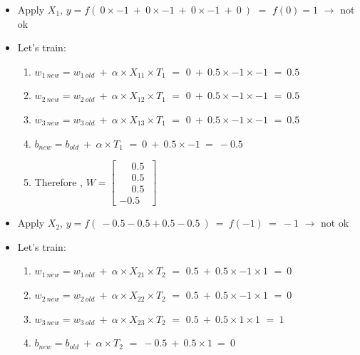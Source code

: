 \documentclass[12pt]{article}
\begin{document}
\begin{itemize}
	\item Apply $X_1$, $y = f( \  0 \times -1 \ + \  0 \times -1\ + \ 0 \times -1\ + \ 0\ )$ $ = $ $f(0) =  1$ $\rightarrow$ not ok
	
	\item Let's train:
			{
				\begin{enumerate}
					
					\item $w_{1\ new} = w_{1\ old}\ +\ \alpha \times X_{11} \times T_1$ $=$ $0\ +\ 0.5 \times -1 \times -1$ $=\ 0.5$
					\item $w_{2\ new} = w_{2\ old}\ +\ \alpha \times X_{12} \times T_1$ $=$ $0\ +\ 0.5 \times -1 \times -1$ $=\ 0.5$
					\item $w_{3\ new} = w_{3\ old}\ +\ \alpha \times X_{13} \times T_1$ $=$ $0\ +\ 0.5 \times -1 \times -1$ $=\ 0.5$
					\item $b_{new} = b_{old} \ + \ \alpha \times T_1$ $=\ 0 \ + \ 0.5 \times -1 \ = \ -0.5$
						
					\item Therefore , $ W = \begin{bmatrix}
						\phantom{-}0.5\ \\ 	
						\phantom{-}0.5\ \\ 	
						\phantom{-}0.5\ \\ 
						-0.5\ 
					\end{bmatrix}$
				\end{enumerate}
			}
		
		\item Apply $X_2$, $y = f(\ -0.5 - 0.5 + 0.5 - 0.5\ ) \ = \ f(-1) \ = \ -1 $ $\rightarrow$ not ok
		
		\item Let's train:
			{
				\begin{enumerate}
						
					\item $w_{1\ new} = w_{1\ old}\ +\ \alpha \times X_{21} \times T_2$ $=$ $0.5\ +\ 0.5 \times -1 \times 1$ $=\ 0$
					\item $w_{2\ new} = w_{2\ old}\ +\ \alpha \times X_{22} \times T_2$ $=$ $0.5\ +\ 0.5 \times -1 \times 1$ $=\ 0$
					\item $w_{3\ new} = w_{3\ old}\ +\ \alpha \times X_{23} \times T_2$ $=$ $0.5\ +\ 0.5 \times 1 \times 1$ $=\ 1$
					\item $b_{new} = b_{old} \ + \ \alpha \times T_2$ $=\ -0.5 \ + \ 0.5 \times 1 \ = \ 0$
					

\end{enumerate}}
\end{itemize}
\end{document}
